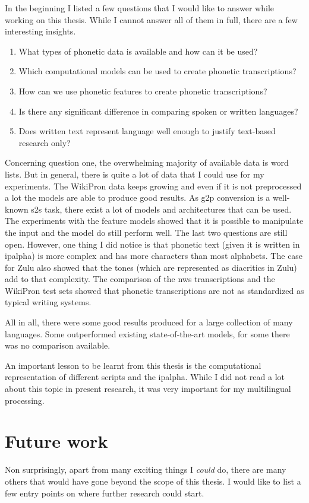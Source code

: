 \label{chap:6_conclusion}
In the beginning I listed a few questions that I would like to answer while working on this thesis. While I cannot answer all of them in full, there are a few interesting insights.

\begin{enumerate}
\item What types of phonetic data is available and how can it be used?
\item Which computational models can be used to create phonetic transcriptions?
\item How can we use phonetic features to create phonetic transcriptions?
\item Is there any significant difference in comparing spoken or written languages?
\item Does written text represent language well enough to justify text-based research only?
\end{enumerate}

Concerning question one, the overwhelming majority of available data is word lists. But in general, there is quite a lot of data that I could use for my experiments. The WikiPron data keeps growing and even if it is not preprocessed a lot the models are able to produce good results. As \ac{g2p} conversion is a well-known \ac{s2s} task, there exist a lot of models and architectures that can be used. The experiments with the feature models showed that it is possible to manipulate the input and the model do still perform well. The last two questions are still open. However, one thing I did notice is that phonetic text (given it is written in \ac{ipalpha}) is more complex and has more characters than most alphabets. The case for Zulu also showed that the tones (which are represented as diacritics in Zulu) add to that complexity. The comparison of the \ac{nws} transcriptions and the WikiPron test sets showed that phonetic transcriptions are not as standardized as typical writing systems. 

All in all, there were some good results produced for a large collection of many languages. Some outperformed existing state-of-the-art models, for some there was no comparison available. 

An important lesson to be learnt from this thesis is the computational representation of different scripts and the \ac{ipalpha}. While I did not read a lot about this topic in present research, it was very important for my multilingual processing.

\section{Future work}
Non surprisingly, apart from many exciting things I \textit{could} do, there are many others that would have gone beyond the scope of this thesis. I would like to list a few entry points on where further research could start. 


